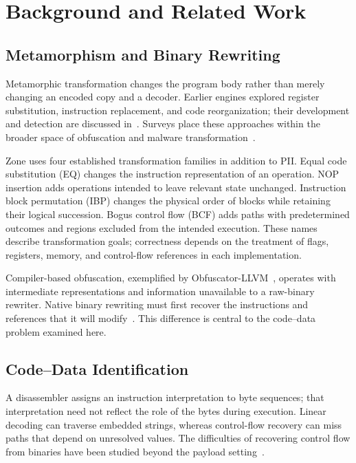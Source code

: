 \section{Background and Related Work}\label{sec:background}
\subsection{Metamorphism and Binary Rewriting}
Metamorphic transformation changes the program body rather than merely
changing an encoded copy and a decoder. Earlier engines explored
register substitution, instruction replacement, and code reorganization;
their development and detection are discussed
in~\cite{historycodeobf,desai2008towards,desai2010highly,szor2001hunting}.
Surveys place these approaches within the broader space of obfuscation
and malware transformation~\cite{survey1,brezinski2023metamorphic,PEsurveybible}.

Zone uses four established transformation families in addition to PII.
Equal code substitution (EQ) changes the instruction representation of
an operation. NOP insertion adds operations intended to leave relevant
state unchanged. Instruction block permutation (IBP) changes the physical
order of blocks while retaining their logical succession. Bogus control
flow (BCF) adds paths with predetermined outcomes and regions excluded
from the intended execution. These names describe transformation goals;
correctness depends on the treatment of flags, registers, memory, and
control-flow references in each implementation.

Compiler-based obfuscation, exemplified by
Obfuscator-LLVM~\cite{llvmobf}, operates with intermediate representations
and information unavailable to a raw-binary rewriter. Native binary
rewriting must first recover the instructions and references that it
will modify~\cite{bin2binobf}. This difference is central to the
code--data problem examined here.

\subsection{Code--Data Identification}
A disassembler assigns an instruction interpretation to byte sequences;
that interpretation need not reflect the role of the bytes during
execution. Linear decoding can traverse embedded strings, whereas
control-flow recovery can miss paths that depend on unresolved values.
The difficulties of recovering control flow from binaries have been
studied beyond the payload setting~\cite{staticdisasmTuringComplete}.


